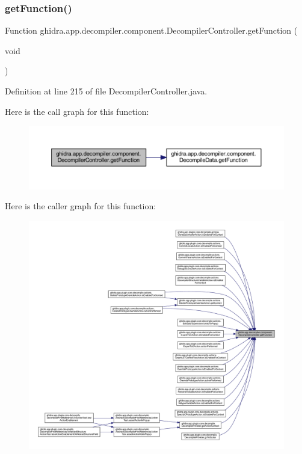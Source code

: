 \subsubsection{\texorpdfstring{getFunction()}{getFunction()}}
{\footnotesize\ttfamily Function ghidra.\+app.\+decompiler.\+component.\+Decompiler\+Controller.\+get\+Function (\begin{DoxyParamCaption}\item[{void}]{ }\end{DoxyParamCaption})\hspace{0.3cm}{\ttfamily [inline]}}



Definition at line 215 of file Decompiler\+Controller.\+java.

Here is the call graph for this function\+:
\nopagebreak
\begin{figure}[H]
\begin{center}
\leavevmode
\includegraphics[width=350pt]{classghidra_1_1app_1_1decompiler_1_1component_1_1_decompiler_controller_a30967cec17162ffd4c107182e0835905_cgraph}
\end{center}
\end{figure}
Here is the caller graph for this function\+:
\nopagebreak
\begin{figure}[H]
\begin{center}
\leavevmode
\includegraphics[width=350pt]{classghidra_1_1app_1_1decompiler_1_1component_1_1_decompiler_controller_a30967cec17162ffd4c107182e0835905_icgraph}
\end{center}
\end{figure}
